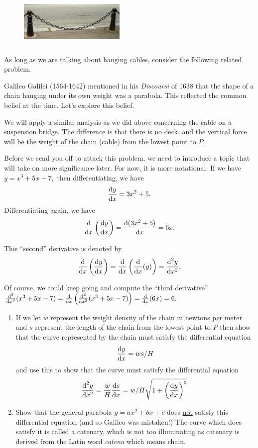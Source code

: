\begin{figure}
\captionsetup{labelformat=empty}
\centerline{\includegraphics*[height=1in,width=2in]{Figures/HangingChain1}}
\label{fig:}
\end{figure}
As long as we are talking about hanging cables, consider the following
related problem.

Galileo Galilei (1564-1642) mentioned in his {\it{}Discoursi} of $1638$ that
the shape of a chain hanging under its own weight was a parabola.
This reflected the common belief at the time.  Let's explore this
belief.


We will apply a similar analysis as we did above concerning the cable
on a suspension bridge.  The difference is that there is no deck, and
the vertical force will be the weight of the chain (cable) from the
lowest point to $P.$

Before we send you off to attack this problem, we need to introduce a
topic that will take on more significance later.  For now, it is more
notational.  If we have $y=x^3+5x-7,$ then differentiating, we have
$$
\frac{\text{d}{y}}{\text{d}{x}}=3x^2+5.
$$
Differentiating again, we have
$$
\frac{\text{d}{}}{\text{d}{x}}\left(\frac{\text{d}{y}}{\text{d}{x}}\right)=\frac{\text{d}{(3x^2+5)}}{\text{d}{x}}=6x.
$$

This ``second'' derivative is denoted by 
$$
\frac{\text{d}{}}{\text{d}{x}}\left(\frac{\text{d}{y}}{\text{d}{x}}\right) =
\frac{\text{d}{}}{\text{d}{x}}\left(\frac{\text{d}{}}{\text{d}{x}}(y)\right) = \frac{\text{d}^{2}{y}}{\text{d}{x}^{2}}.
$$

Of course, we could keep going and compute the ``third derivative''
$\frac{\text{d}^{3}{}}{\text{d}{x}^{3}} (x^3+5x-7)
=\frac{\text{d}{}}{\text{d}{x}}\left(\frac{\text{d}^{2}{}}{\text{d}{x}^{2}}(x^3+5x-7)\right)=\frac{\text{d}{}}{\text{d}{x}} (6x)=6. $ 

\begin{embeddedproblem}{}
    \begin{enumerate}[label={\bf{}(\alph*)}]
    \item If we let $w$ represent the weight density of the chain in
      newtons per meter and $s$ represent the length of the chain from
      the lowest point to $P$ then show that the curve represented by
      the chain must satisfy the differential equation
$$
\frac{\text{d}{y}}{\text{d}{x}}=ws/H
$$
and use this to show that the curve must satisfy the differential equation
$$
\frac{\text{d}^{2}{y}}{\text{d}{x}^{2}}=\frac{w}{H}  \frac{\text{d}{s}}{\text{d}{x}}=w/H
\sqrt{1+\left(\frac{\text{d}{y}}{\text{d}{x}}\right)^2 }.
$$
\item Show that the general parabola $y=ax^2+bx+c$ does \underline{not} satisfy this
  differential equation (and so Galileo was mistaken!)  The curve
  which does satisfy it is called a catenary, which is not too
  illuminating as catenary is derived from the Latin word {\it{}catena} which
  means chain.
    \end{enumerate}
\end{embeddedproblem}


